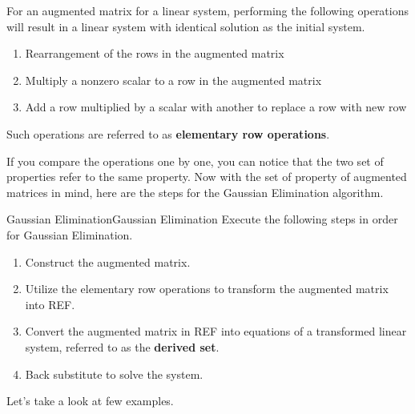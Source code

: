 \documentclass[../main.tex]{subfiles}
\begin{document}
\begin{definition}
For an augmented matrix for a linear system, performing the following
operations will result in a linear system with identical solution as
the initial system.
\begin{enumerate}[noitemsep]
\item[$R_1$.]
Rearrangement of the rows in the augmented matrix
\item[$R_2$.]
Multiply a nonzero scalar to a row in the augmented matrix
\item[$R_3$.]
Add a row multiplied by a scalar with another to replace a row with
new row
\end{enumerate}
Such operations are referred to as \textbf{elementary row operations}.
\end{definition}

If you compare the operations one by one, you can notice that the
two set of properties refer to the same property. Now with the
set of property of augmented matrices in mind, here are the steps
for the Gaussian Elimination algorithm.

\begin{theorem}{Gaussian Elimination}{Gaussian Elimination}
Execute the following steps in order for Gaussian Elimination.
\begin{enumerate}[noitemsep]
\item
Construct the augmented matrix.
\item
Utilize the elementary row operations to transform the augmented
matrix into REF.
\item
Convert the augmented matrix in REF into equations of a transformed
linear system, referred to as the \textbf{derived set}.
\item
Back substitute to solve the system.
\end{enumerate}
\end{theorem}

Let's take a look at few examples.
\end{document}
